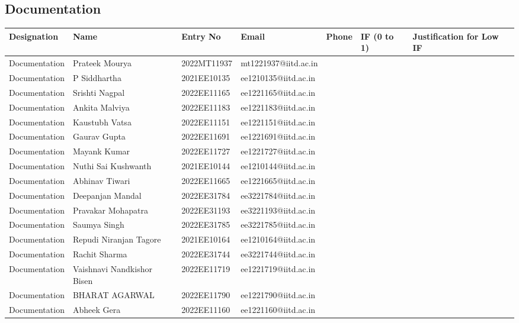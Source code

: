 \documentclass[a4paper,12pt]{article}
\begin{document}
\subsection{Documentation}
\begin{longtable}[c]{|l|l|l|l|l|l|l|}
\hline
\textbf{Designation} & \textbf{Name} & \textbf{Entry No} & \textbf{Email} & \textbf{Phone} & \textbf{IF (0 to 1)} & \textbf{Justification for Low IF} \\
\hline
Documentation & Prateek Mourya & 2022MT11937 & mt1221937@iitd.ac.in &  &  &  \\ \hline
Documentation & P Siddhartha & 2021EE10135 & ee1210135@iitd.ac.in &  &  &  \\ \hline
Documentation & Srishti Nagpal & 2022EE11165 & ee1221165@iitd.ac.in &  &  &  \\ \hline
Documentation & Ankita Malviya & 2022EE11183 & ee1221183@iitd.ac.in &  &  &  \\ \hline
Documentation & Kaustubh Vatsa & 2022EE11151 & ee1221151@iitd.ac.in &  &  &  \\ \hline
Documentation & Gaurav Gupta & 2022EE11691 & ee1221691@iitd.ac.in &  &  &  \\ \hline
Documentation & Mayank Kumar & 2022EE11727 & ee1221727@iitd.ac.in &  &  &  \\ \hline
Documentation & Nuthi Sai Kushwanth & 2021EE10144 & ee1210144@iitd.ac.in &  &  &  \\ \hline
Documentation & Abhinav Tiwari & 2022EE11665 & ee1221665@iitd.ac.in &  &  &  \\ \hline
Documentation & Deepanjan Mandal & 2022EE31784 & ee3221784@iitd.ac.in &  &  &  \\ \hline
Documentation & Pravakar Mohapatra & 2022EE31193 & ee3221193@iitd.ac.in &  &  &  \\ \hline
Documentation & Saumya Singh & 2022EE31785 & ee3221785@iitd.ac.in &  &  &  \\ \hline
Documentation & Repudi Niranjan Tagore & 2021EE10164 & ee1210164@iitd.ac.in &  &  &  \\ \hline
Documentation & Rachit Sharma & 2022EE31744 & ee3221744@iitd.ac.in &  &  &  \\ \hline
Documentation & Vaishnavi Nandkishor Bisen & 2022EE11719 & ee1221719@iitd.ac.in &  &  &  \\ \hline
Documentation & BHARAT AGARWAL & 2022EE11790 & ee1221790@iitd.ac.in &  &  &  \\ \hline
Documentation & Abheek Gera & 2022EE11160 & ee1221160@iitd.ac.in &  &  &  \\ \hline
\end{longtable}
\end{document}
